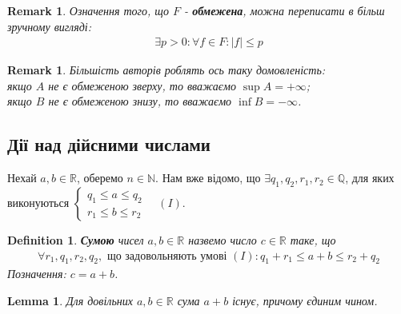 \documentclass[a4paper, 14pt]{article}
\theoremstyle{theoremdd}
\theoremstyle{theoremdd}
\newtheorem{definition}[theorem]{Definition}
\theoremstyle{theoremdd}
\theoremstyle{theoremdd}
\theoremstyle{theoremdd}
\theoremstyle{theoremdd}
\newtheorem{remark}[theorem]{Remark}
\theoremstyle{theoremdd}
\newtheorem{lemma}[theorem]{Lemma}
\theoremstyle{theoremdd}
\begin{document}
	\begin{remark}
	Означення того, що $F$ - \textbf{обмежена}, можна переписати в більш зручному вигляді:
	\begin{align*}
	\exists p>0: \forall f \in F: |f| \leq p
	\end{align*}
	\end{remark}
	
	\begin{remark}
	Більшість авторів роблять ось таку домовленість:\\
	якщо $A$ не є обмеженою зверху, то вважаємо $\sup A = +\infty$;\\
	якщо $B$ не є обмеженою знизу, то вважаємо $\inf B = -\infty$.
	\end{remark}
	
	\subsection{Дії над дійсними числами}
	Нехай $a,b \in \mathbb{R}$, оберемо $n \in \mathbb{N}$. Нам вже відомо, що $\exists q_1,q_2,r_1,r_2 \in \mathbb{Q}$, для яких виконуються $\begin{cases} q_1 \leq a \leq q_2 \\ r_1 \leq b \leq r_2 \end{cases} \quad (I)$.
	\begin{definition}
	\textbf{Сумою} чисел $a,b \in \mathbb{R}$ назвемо число $c \in \mathbb{R}$ таке, що
	\begin{align*}
	\forall r_1, q_1, r_2, q_2, \text{ що задовольняють умові } (I): q_1 + r_1 \leq a + b \leq r_2 + q_2
	\end{align*}
	Позначення: $c = a+b$.
	\end{definition}
	
	\begin{lemma}
	Для довільних $a,b \in \mathbb{R}$ сума $a+b$ існує, причому єдиним чином.
	\end{lemma}
	
\end{document}
